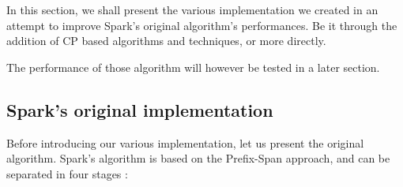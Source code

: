 \documentclass{eplmastersthesis}
\begin{document}
In this section, we shall present the various implementation we created in an attempt to improve Spark's original algorithm's performances. Be it through the addition of CP based algorithms and techniques, or more directly. \newline

The performance of those algorithm will however be tested in a later section.

\subsection{Spark's original implementation}

Before introducing our various implementation, let us present the original algorithm.
Spark's algorithm is based on the Prefix-Span approach, and can be separated in four stages :
\end{document}
